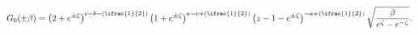 \[G_{0}(\pm\beta)=\left(2+e^{\pm\zeta}\right)^{c-b-(\ifrac{1}{2})}\left(1+e^{\pm%
\zeta}\right)^{a-c+(\ifrac{1}{2})}\left(z-1-e^{\pm\zeta}\right)^{-a+(\ifrac{1}%
{2})}\sqrt{\frac{\beta}{e^{\zeta}-e^{-\zeta}}}.\]